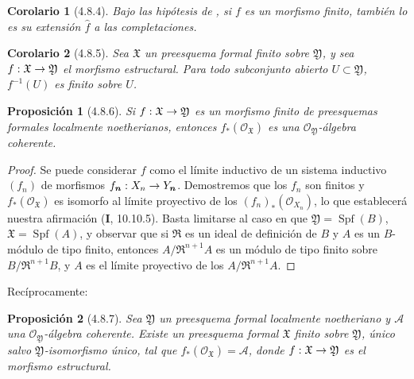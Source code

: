 \documentclass[10pt,oneside,openany]{book}
\theoremstyle{egaenv}\newtheorem*{env}{---}
\theoremstyle{egastatement}
\newtheorem*{proposition}{Proposición}
\newtheorem*{corollary}{Corolario}
\theoremstyle{egadescription}
\renewcommand{\to}{\mathchoice{\longrightarrow}{\rightarrow}{\rightarrow}{\rightarrow}}
\begin{document}
\begin{corollary}[4.8.4]
\label{III.4.8.4}
\label{III.4.8.4-fr}
Bajo las hipótesis de , si $f$ es un morfismo
finito, también lo es su extensión $\widehat f$ a las
completaciones.
\end{corollary}

\begin{corollary}[4.8.5]
\label{III.4.8.5}
\label{III.4.8.5-fr}
Sea $\mathfrak X$ un preesquema formal finito sobre
$\mathfrak Y$, y sea
$f:\mathfrak X\to\mathfrak Y$ el morfismo estructural. Para
todo subconjunto abierto $U\subset\mathfrak Y$, $f^{-1}(U)$ es finito sobre $U$.
\end{corollary}

\begin{proposition}[4.8.6]
\label{III.4.8.6}
\label{III.4.8.6-fr}
Si $f:\mathfrak X\to\mathfrak Y$ es un morfismo finito de preesquemas
formales localmente noetherianos, entonces
$f_*(\mathcal O_{\mathfrak X})$ es una
$\mathcal O_{\mathfrak Y}$-álgebra coherente.
\end{proposition}

\begin{proof}
Se puede considerar $f$ como el límite inductivo de un sistema inductivo
$(f_n)$ de morfismos $f_{\boldsymbol{n}}:X_n\to Y_{\boldsymbol{n}}$. Demostremos que los
$f_n$ son finitos y $f_*(\mathcal O_{\mathfrak X})$ es
isomorfo al límite proyectivo de los
$(f_n)_*(\mathcal O_{X_n})$, lo que establecerá nuestra afirmación (\textbf{I}, 10.10.5).
Basta limitarse al caso en que $\mathfrak Y=\operatorname{Spf}(B)$,
$\mathfrak X=\operatorname{Spf}(A)$, y observar que si $\mathfrak R$ es un ideal de definición
de $B$ y $A$ es un $B$-módulo de tipo finito, entonces
$A/\mathfrak R^{n+1}A$ es un módulo de tipo finito sobre
$B/\mathfrak R^{n+1}B$, y $A$ es el límite proyectivo de los
$A/\mathfrak R^{n+1}A$.
\end{proof}

Recíprocamente:

\begin{proposition}[4.8.7]
\label{III.4.8.7}
\label{III.4.8.7-fr}
Sea $\mathfrak Y$ un preesquema formal localmente noetheriano y
$\mathcal A$ una $\mathcal O_{\mathfrak Y}$-álgebra coherente. Existe
un preesquema formal $\mathfrak X$ finito sobre $\mathfrak Y$,
único salvo $\mathfrak Y$-isomorfismo único, tal que
$f_*(\mathcal O_{\mathfrak X})=\mathcal A$,
donde $f:\mathfrak X\to\mathfrak Y$ es el morfismo estructural.
\end{proposition}
\end{document}
